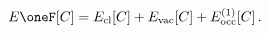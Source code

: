 \begin{equation}
E\oneF[C] = E_{\rm cl}[C] + E_{\rm vac}[C]+ E_{\rm occ}^{(1)}[C] \, .
\label{allTheEs}
\end{equation}

